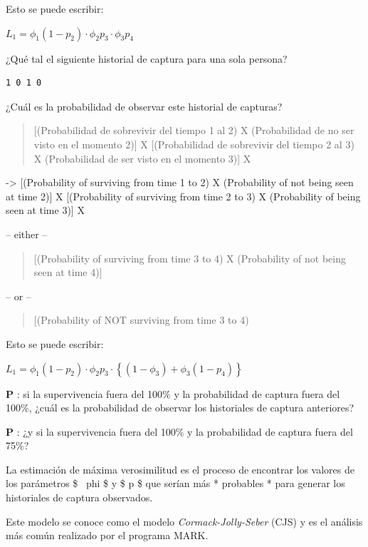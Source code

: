 \documentclass[
]{article}
\begin{document}
Esto se puede escribir:

\(L_1 = \phi_1(1-p_2) \cdot \phi_2p_3 \cdot \phi_3p_4\)

¿Qué tal el siguiente historial de captura para una sola persona?

\begin{verbatim}
1 0 1 0
\end{verbatim}

¿Cuál es la probabilidad de observar este historial de capturas?

\begin{quote}
{[}(Probabilidad de sobrevivir del tiempo 1 al 2) X (Probabilidad de no
ser visto en el momento 2){]} X {[}(Probabilidad de sobrevivir del
tiempo 2 al 3) X (Probabilidad de ser visto en el momento 3){]} X
\end{quote}

-\textgreater{} {[}(Probability of surviving from time 1 to 2) X
(Probability of not being seen at time 2){]} X {[}(Probability of
surviving from time 2 to 3) X (Probability of being seen at time 3){]} X

-- either --

\begin{quote}
{[}(Probability of surviving from time 3 to 4) X (Probability of not
being seen at time 4){]}
\end{quote}

-- or --

\begin{quote}
{[}(Probability of NOT surviving from time 3 to 4)
\end{quote}

Esto se puede escribir:

\(L_1 = \phi_1(1-p_2) \cdot \phi_2p_3 \cdot \left \{(1-\phi_3)+\phi_3(1-p_4) \right \}\)

\textbf{P }: si la supervivencia fuera del 100\% y la probabilidad de
captura fuera del 100\%, ¿cuál es la probabilidad de observar los
historiales de captura anteriores?

\textbf{P }: ¿y si la supervivencia fuera del 100\% y la probabilidad de
captura fuera del 75\%?

La estimación de máxima verosimilitud es el proceso de encontrar los
valores de los parámetros \$ ~phi \$ y \$ p \$ que serían más *
probables * para generar los historiales de captura observados.

Este modelo se conoce como el modelo \emph{Cormack-Jolly-Seber } (CJS) y
es el análisis más común realizado por el programa MARK.
\end{document}
